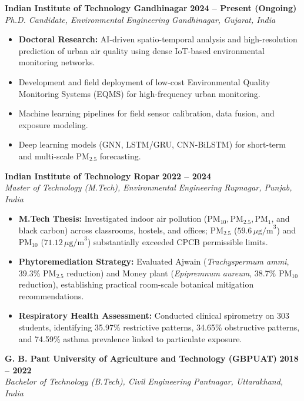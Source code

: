 \documentclass[10pt,a4paper]{article}
\begin{document}
\textbf{Indian Institute of Technology Gandhinagar} \hfill \textbf{2024 -- Present (Ongoing)}\\
\textit{Ph.D. Candidate, Environmental Engineering} \hfill \textit{Gandhinagar, Gujarat, India}
\begin{itemize}
    \item \textbf{Doctoral Research:} AI-driven spatio-temporal analysis and high-resolution prediction of urban air quality using dense IoT-based environmental monitoring networks.
    \item Development and field deployment of low-cost Environmental Quality Monitoring Systems (EQMS) for high-frequency urban monitoring.
    \item Machine learning pipelines for field sensor calibration, data fusion, and exposure modeling.
    \item Deep learning models (GNN, LSTM/GRU, CNN-BiLSTM) for short-term and multi-scale $\text{PM}_{2.5}$ forecasting.
\end{itemize}

\vspace{3pt}
\textbf{Indian Institute of Technology Ropar} \hfill \textbf{2022 -- 2024}\\
\textit{Master of Technology (M.Tech), Environmental Engineering} \hfill \textit{Rupnagar, Punjab, India}
\begin{itemize}
    \item \textbf{M.Tech Thesis:} Investigated indoor air pollution ($\text{PM}_{10}, \text{PM}_{2.5}, \text{PM}_1$, and black carbon) across classrooms, hostels, and offices; $\text{PM}_{2.5}$ ($59.6\,\mu\text{g/m}^3$) and $\text{PM}_{10}$ ($71.12\,\mu\text{g/m}^3$) substantially exceeded CPCB permissible limits.
    \item \textbf{Phytoremediation Strategy:} Evaluated Ajwain (\textit{Trachyspermum ammi}, 39.3\% $\text{PM}_{2.5}$ reduction) and Money plant (\textit{Epipremnum aureum}, 38.7\% $\text{PM}_{10}$ reduction), establishing practical room-scale botanical mitigation recommendations.
    \item \textbf{Respiratory Health Assessment:} Conducted clinical spirometry on 303 students, identifying 35.97\% restrictive patterns, 34.65\% obstructive patterns, and 74.59\% asthma prevalence linked to particulate exposure.
\end{itemize}

\vspace{3pt}
\textbf{G. B. Pant University of Agriculture and Technology (GBPUAT)} \hfill \textbf{2018 -- 2022}\\
\textit{Bachelor of Technology (B.Tech), Civil Engineering} \hfill \textit{Pantnagar, Uttarakhand, India}
\end{document}
